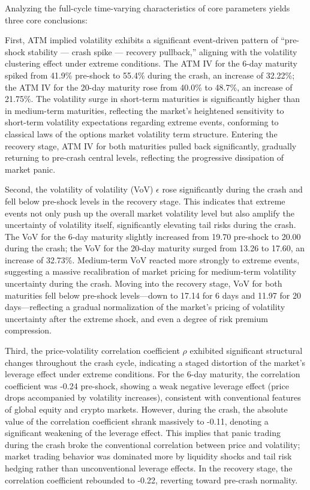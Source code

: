 Analyzing the full-cycle time-varying characteristics of core parameters yields three core conclusions:

First, ATM implied volatility exhibits a significant event-driven pattern of ``pre-shock stability — crash spike — recovery pullback,'' aligning with the volatility clustering effect under extreme conditions. The ATM IV for the 6-day maturity spiked from 41.9\% pre-shock to 55.4\% during the crash, an increase of 32.22\%; the ATM IV for the 20-day maturity rose from 40.0\% to 48.7\%, an increase of 21.75\%. The volatility surge in short-term maturities is significantly higher than in medium-term maturities, reflecting the market's heightened sensitivity to short-term volatility expectations regarding extreme events, conforming to classical laws of the options market volatility term structure. Entering the recovery stage, ATM IV for both maturities pulled back significantly, gradually returning to pre-crash central levels, reflecting the progressive dissipation of market panic.

Second, the volatility of volatility (VoV) $\epsilon$ rose significantly during the crash and fell below pre-shock levels in the recovery stage. This indicates that extreme events not only push up the overall market volatility level but also amplify the uncertainty of volatility itself, significantly elevating tail risks during the crash. The VoV for the 6-day maturity slightly increased from 19.70 pre-shock to 20.00 during the crash; the VoV for the 20-day maturity surged from 13.26 to 17.60, an increase of 32.73\%. Medium-term VoV reacted more strongly to extreme events, suggesting a massive recalibration of market pricing for medium-term volatility uncertainty during the crash. Moving into the recovery stage, VoV for both maturities fell below pre-shock levels—down to 17.14 for 6 days and 11.97 for 20 days—reflecting a gradual normalization of the market's pricing of volatility uncertainty after the extreme shock, and even a degree of risk premium compression.

Third, the price-volatility correlation coefficient $\rho$ exhibited significant structural changes throughout the crash cycle, indicating a staged distortion of the market's leverage effect under extreme conditions. For the 6-day maturity, the correlation coefficient was -0.24 pre-shock, showing a weak negative leverage effect (price drops accompanied by volatility increases), consistent with conventional features of global equity and crypto markets. However, during the crash, the absolute value of the correlation coefficient shrank massively to -0.11, denoting a significant weakening of the leverage effect. This implies that panic trading during the crash broke the conventional correlation between price and volatility; market trading behavior was dominated more by liquidity shocks and tail risk hedging rather than unconventional leverage effects. In the recovery stage, the correlation coefficient rebounded to -0.22, reverting toward pre-crash normality.

